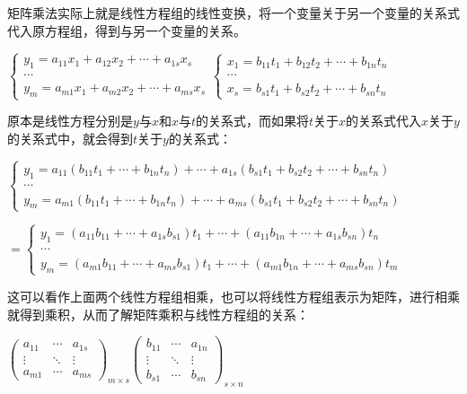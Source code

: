 \documentclass[UTF8, 12pt]{ctexart}
\begin{document}
矩阵乘法实际上就是线性方程组的线性变换，将一个变量关于另一个变量的关系式代入原方程组，得到与另一个变量的关系。

$\begin{cases}
    y_1=a_{11}x_1+a_{12}x_2+\cdots+a_{1s}x_s \\
    \cdots \\
    y_m=a_{m1}x_1+a_{m2}x_2+\cdots+a_{ms}x_s
\end{cases}\begin{cases}
    x_1=b_{11}t_1+b_{12}t_2+\cdots+b_{1n}t_n \\
    \cdots \\
    x_s=b_{s1}t_1+b_{s2}t_2+\cdots+b_{sn}t_n
\end{cases}$\medskip

原本是线性方程分别是$y$与$x$和$x$与$t$的关系式，而如果将$t$关于$x$的关系式代入$x$关于$y$的关系式中，就会得到$t$关于$y$的关系式：\medskip

$\begin{cases}
    y_1=a_{11}(b_{11}t_1+\cdots+b_{1n}t_n)+\cdots+a_{1s}(b_{s1}t_1+b_{s2}t_2+\cdots+b_{sn}t_n) \\
    \cdots \\
    y_m=a_{m1}(b_{11}t_1+\cdots+b_{1n}t_n)+\cdots+a_{ms}(b_{s1}t_1+b_{s2}t_2+\cdots+b_{sn}t_n)
\end{cases}$

$=\begin{cases}
    y_1=(a_{11}b_{11}+\cdots+a_{1s}b_{s1})t_1+\cdots+(a_{11}b_{1n}+\cdots+a_{1s}b_{sn})t_n \\
    \cdots \\
    y_m=(a_{m1}b_{11}+\cdots+a_{ms}b_{s1})t_1+\cdots+(a_{m1}b_{1n}+\cdots+a_{ms}b_{sn})t_m
\end{cases}$ \medskip

这可以看作上面两个线性方程组相乘，也可以将线性方程组表示为矩阵，进行相乘就得到乘积，从而了解矩阵乘积与线性方程组的关系：\medskip


$\left(\begin{array}{ccc}
    a_{11} & \cdots & a_{1s} \\
    \vdots & \ddots & \vdots \\
    a_{m1} & \cdots & a_{ms}
\end{array}\right)_{m\times s}\left(\begin{array}{ccc}
    b_{11} & \cdots & a_{1n} \\
    \vdots & \ddots & \vdots \\
    b_{s1} & \cdots & b_{sn}
\end{array}\right)_{s\times n}$
\end{document}
